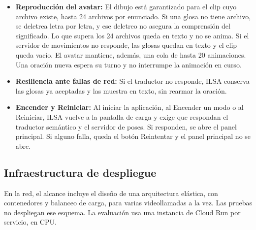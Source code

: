 \begin{itemize}
    \item \textbf{Reproducción del avatar:} El dibujo está garantizado para el clip cuyo archivo existe, hasta 24 archivos por enunciado. Si una glosa no tiene archivo, se deletrea letra por letra, y ese deletreo no asegura la comprensión del significado. Lo que supera los 24 archivos queda en texto y no se anima. Si el servidor de movimientos no responde, las glosas quedan en texto y el clip queda vacío. El avatar mantiene, además, una cola de hasta 20 animaciones. Una oración nueva espera su turno y no interrumpe la animación en curso.
    \item \textbf{Resiliencia ante fallas de red:} Si el traductor no responde, ILSA conserva las glosas ya aceptadas y las muestra en texto, sin rearmar la oración.
    \item \textbf{Encender y Reiniciar:} Al iniciar la aplicación, al Encender un modo o al Reiniciar, ILSA vuelve a la pantalla de carga y exige que respondan el traductor semántico y el servidor de poses. Si responden, se abre el panel principal. Si alguno falla, queda el botón Reintentar y el panel principal no se abre.
\end{itemize}

\subsection{Infraestructura de despliegue}
En la red, el alcance incluye el diseño de una arquitectura elástica, con contenedores y balanceo de carga, para varias videollamadas a la vez. Las pruebas no despliegan ese esquema. La evaluación usa una instancia de Cloud Run por servicio, en CPU.